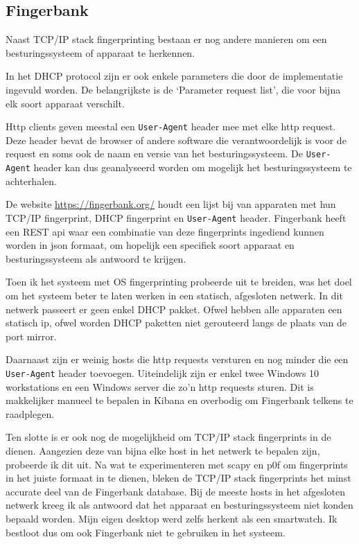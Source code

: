 \documentclass[a4paper,12pt]{report}
\begin{document}
\subsection{Fingerbank}
\label{sec:fingerbank}
Naast TCP/IP stack fingerprinting bestaan er nog andere manieren om een besturingssysteem of apparaat te herkennen.

In het DHCP protocol zijn er ook enkele parameters die door de implementatie ingevuld worden.
De belangrijkste is de `Parameter request list', die voor bijna elk soort apparaat verschilt.

Http clients geven meestal een \lstinline|User-Agent| header mee met elke http request.
Deze header bevat de browser of andere software die verantwoordelijk is voor de request en soms ook de naam en versie van het besturingssysteem.
De \lstinline|User-Agent| header kan dus geanalyseerd worden om mogelijk het besturingssysteem te achterhalen.

De website \url{https://fingerbank.org/} houdt een lijst bij van apparaten met hun TCP/IP fingerprint, DHCP fingerprint en \lstinline|User-Agent| header.
Fingerbank heeft een REST api waar een combinatie van deze fingerprints ingediend kunnen worden in json formaat, om hopelijk een specifiek soort apparaat en besturingssysteem als antwoord te krijgen.

Toen ik het systeem met OS fingerprinting probeerde uit te breiden, was het doel om het systeem beter te laten werken in een statisch, afgesloten netwerk.
In dit netwerk passeert er geen enkel DHCP pakket.
Ofwel hebben alle apparaten een statisch ip, ofwel worden DHCP paketten niet gerouteerd langs de plaats van de port mirror.

Daarnaast zijn er weinig hosts die http requests versturen en nog minder die een \lstinline|User-Agent| header toevoegen.
Uiteindelijk zijn er enkel twee Windows 10 workstations en een Windows server die zo'n http requests sturen.
Dit is makkelijker manueel te bepalen in Kibana en overbodig om Fingerbank telkens te raadplegen.

Ten slotte is er ook nog de mogelijkheid om TCP/IP stack fingerprints in de dienen.
Aangezien deze van bijna elke host in het netwerk te bepalen zijn, probeerde ik dit uit.
Na wat te experimenteren met scapy en p0f om fingerprints in het juiste formaat in te dienen, bleken de TCP/IP stack fingerprints het minst accurate deel van de Fingerbank database.
Bij de meeste hosts in het afgesloten netwerk kreeg ik als antwoord dat het apparaat en besturingssysteem niet konden bepaald worden.
Mijn eigen desktop werd zelfs herkent als een smartwatch.
Ik bestloot dus om ook Fingerbank niet te gebruiken in het systeem.
\end{document}
